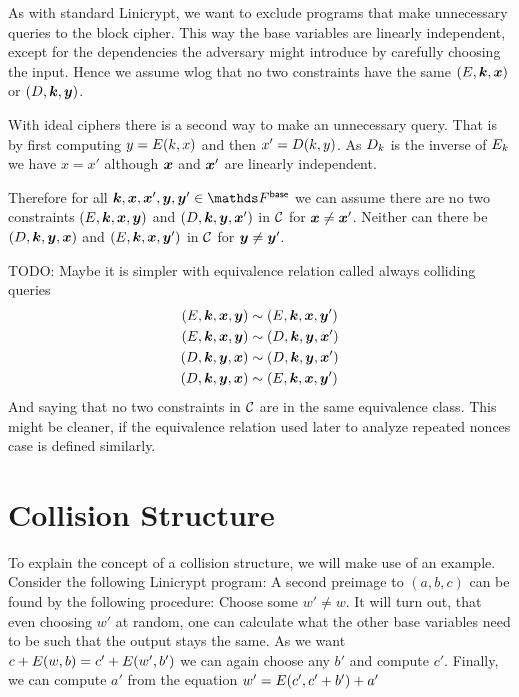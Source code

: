 As with standard Linicrypt,
we want to exclude programs that make unnecessary queries to the block cipher.
This way the base variables are linearly independent,
except for the dependencies the adversary might introduce by carefully choosing the input.
Hence we assume wlog that no two constraints have the same $(E, \boldsymbol k, \boldsymbol x)$ or $(D, \boldsymbol k, \boldsymbol y)$.

With ideal ciphers there is a second way to make an unnecessary query.
That is by first computing $y = E(k,x)$ and then $x' = D(k, y)$.
As $D_k$ is the inverse of $E_k$ we have $x = x'$ although $\boldsymbol x$ and $\boldsymbol x'$ are linearly independent.


Therefore for all $\v k, \v x, \v x', \v y, \v y' \in \Base$ we can assume there are no two constraints
$(E, \boldsymbol k,\boldsymbol x, \boldsymbol y)$ and $(D, \boldsymbol k, \boldsymbol y, \boldsymbol x')$ in $\mathcal{C}$ for $\boldsymbol x \neq \boldsymbol x'$.
Neither can there be $(D, \boldsymbol k,\boldsymbol y, \boldsymbol x)$ and $(E, \boldsymbol k, \boldsymbol x, \boldsymbol y')$ in $\mathcal{C}$ for $\boldsymbol y \neq \boldsymbol y'$.

TODO: Maybe it is simpler with equivalence relation called always colliding queries
\begin{align*}
    (E, \boldsymbol k,\boldsymbol x, \boldsymbol y) &\sim (E, \boldsymbol k, \boldsymbol x, \boldsymbol y') \\ 
    (E, \boldsymbol k,\boldsymbol x, \boldsymbol y) &\sim (D, \boldsymbol k, \boldsymbol y, \boldsymbol x') \\
    (D, \boldsymbol k,\boldsymbol y, \boldsymbol x) &\sim (D, \boldsymbol k, \boldsymbol y, \boldsymbol x') \\
    (D, \boldsymbol k,\boldsymbol y, \boldsymbol x) &\sim (E, \boldsymbol k, \boldsymbol x, \boldsymbol y')
\end{align*}
And saying that no two constraints in $\mathcal{C}$ are in the same equivalence class.
This might be cleaner, if the equivalence relation used later to analyze repeated nonces case is defined similarly.

\section{Collision Structure}

To explain the concept of a collision structure, we will make use of an example.
Consider the following Linicrypt program:
A second preimage to $(a,b,c)$ can be found by the following procedure:
Choose some $w' \neq w$.
It will turn out, that even choosing $w'$ at random,
one can calculate what the other base variables need to be such that the output stays the same.
As we want $c + E(w,b) = c' + E(w', b')$ we can again choose any $b'$ and compute $c'$. 
Finally, we can compute $a'$ from the equation $w' = E(c', c' + b') + a'$


